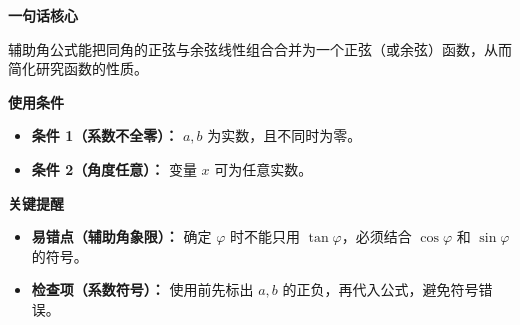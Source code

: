 \begin{summarybox}
	\textbf{\textcolor{CSummary}{一句话核心}}

	辅助角公式能把同角的正弦与余弦线性组合合并为一个正弦（或余弦）函数，从而简化研究函数的性质。

	\medskip
	\textbf{\textcolor{CSummary}{使用条件}}
	\begin{itemize}[leftmargin=*, itemsep=0.5em, topsep=0.4em]
		\item \textbf{条件 1（系数不全零）：} $a,b$ 为实数，且不同时为零。
		\item \textbf{条件 2（角度任意）：} 变量 $x$ 可为任意实数。
	\end{itemize}

	\medskip
	\textbf{\textcolor{CSummary}{关键提醒}}
	\begin{itemize}[leftmargin=*, itemsep=0.5em, topsep=0.4em]
		\item \textbf{易错点（辅助角象限）：} 确定 $\varphi$ 时不能只用 $\tan\varphi$，必须结合 $\cos\varphi$ 和 $\sin\varphi$ 的符号。
		\item \textbf{检查项（系数符号）：} 使用前先标出 $a,b$ 的正负，再代入公式，避免符号错误。
	\end{itemize}
\end{summarybox}
